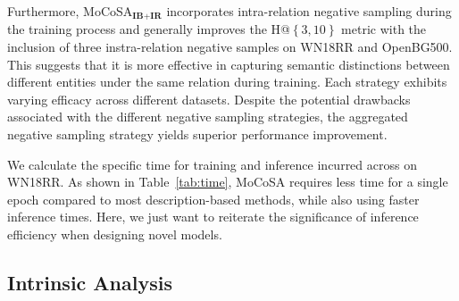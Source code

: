 \documentclass[11pt]{article}
\begin{document}
Furthermore, MoCoSA$_\textbf{IB+IR}$ incorporates intra-relation negative sampling during the training process and generally improves the H@$\left\{3, 10\right\}$ metric with the inclusion of three instra-relation negative samples on WN18RR and OpenBG500. This suggests that it is more effective in capturing semantic distinctions between different entities under the same relation during training. Each strategy exhibits varying efficacy across different datasets. Despite the potential drawbacks associated with the different negative sampling strategies, the aggregated negative sampling strategy yields superior performance improvement.
\begin{table}[!htbp]
	\centering
        \caption{
        Efficiency comparisons between MoCoSA and other PLM-based methods on WN18RR. Here, T/Ep and Inf indicate the training time per epoch and the inference time.
        }
        \vspace{-10pt}
        \label{tab:time} 
\end{table}
We calculate the specific time for training and inference incurred across on WN18RR. As shown in Table~\ref{tab:time}, MoCoSA requires less time for a single epoch compared to most description-based methods, while also using faster inference times. Here, we just want to reiterate the significance of inference efficiency when designing novel models.

\subsection{Intrinsic Analysis}
\end{document}
